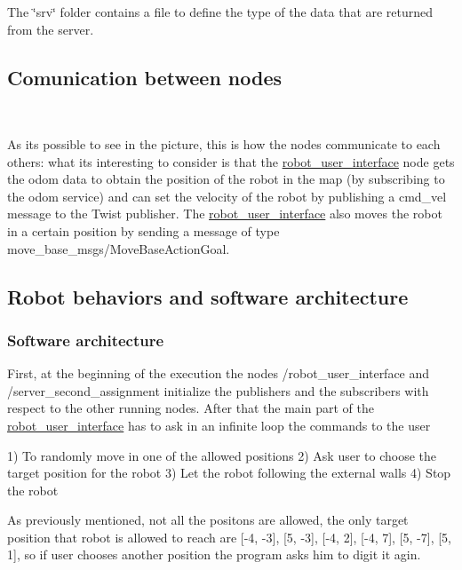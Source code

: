 The \char`\"{}srv\char`\"{} folder contains a file to define the type of the data that are returned from the server.

\subsection*{Comunication between nodes}



~\newline


As it\textquotesingle{}s possible to see in the picture, this is how the nodes communicate to each others\+: what it\textquotesingle{}s interesting to consider is that the \hyperlink{namespacerobot__user__interface}{robot\+\_\+user\+\_\+interface} node gets the odom data to obtain the position of the robot in the map (by subscribing to the odom service) and can set the velocity of the robot by publishing a cmd\+\_\+vel message to the Twist publisher. The \hyperlink{namespacerobot__user__interface}{robot\+\_\+user\+\_\+interface} also moves the robot in a certain position by sending a message of type move\+\_\+base\+\_\+msgs/\+Move\+Base\+Action\+Goal.

\subsection*{Robot behaviors and software architecture}

\subsubsection*{Software architecture}

First, at the beginning of the execution the nodes /robot\+\_\+user\+\_\+interface and /server\+\_\+second\+\_\+assignment initialize the publishers and the subscribers with respect to the other running nodes. After that the main part of the \hyperlink{namespacerobot__user__interface}{robot\+\_\+user\+\_\+interface} has to ask in an infinite loop the commands to the user

1) To randomly move in one of the allowed positions 2) Ask user to choose the target position for the robot 3) Let the robot following the external walls 4) Stop the robot

As previously mentioned, not all the positons are allowed, the only target position that robot is allowed to reach are \mbox{[}-\/4, -\/3\mbox{]}, \mbox{[}5, -\/3\mbox{]}, \mbox{[}-\/4, 2\mbox{]}, \mbox{[}-\/4, 7\mbox{]}, \mbox{[}5, -\/7\mbox{]}, \mbox{[}5, 1\mbox{]}, so if user chooses another position the program asks him to digit it agin.


